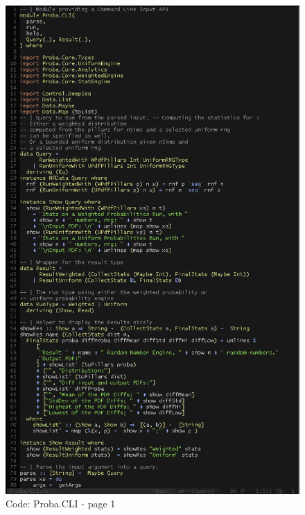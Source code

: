 \documentclass[12pt,a4paper,titlepage]{article}
\begin{document}
\begin{figure}[h!]
\centering
\includegraphics[width=1\textwidth]{img/code-cli-1.png}
\caption{Code: Proba.CLI - page 1}
\label{fig:core.cli1}
\end{figure}
\end{document}
